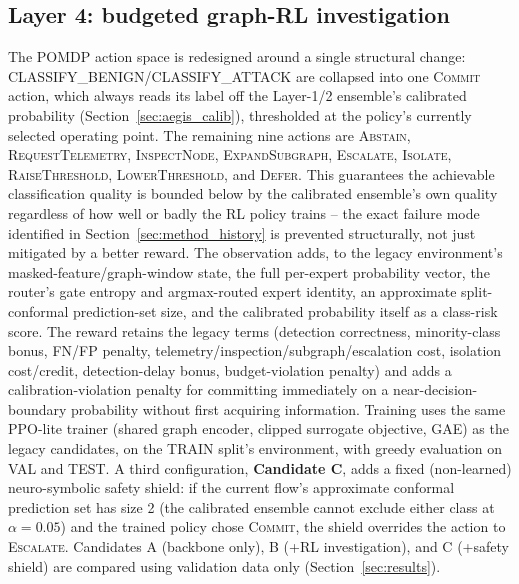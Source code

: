 \documentclass[journal]{IEEEtran}
\begin{document}
\subsection{Layer 4: budgeted graph-RL investigation}
\label{sec:aegis_rl}
The POMDP action space is redesigned around a single structural change:
CLASSIFY\_BENIGN/CLASSIFY\_ATTACK are collapsed into one \textsc{Commit}
action, which always reads its label off the Layer-1/2 ensemble's calibrated
probability (Section~\ref{sec:aegis_calib}), thresholded at the policy's
currently selected operating point. The remaining nine actions are
\textsc{Abstain}, \textsc{RequestTelemetry}, \textsc{InspectNode},
\textsc{ExpandSubgraph}, \textsc{Escalate}, \textsc{Isolate},
\textsc{RaiseThreshold}, \textsc{LowerThreshold}, and \textsc{Defer}. This
guarantees the achievable classification quality is bounded below by the
calibrated ensemble's own quality regardless of how well or badly the RL
policy trains -- the exact failure mode identified in
Section~\ref{sec:method_history} is prevented structurally, not just
mitigated by a better reward. The observation adds, to the legacy
environment's masked-feature/graph-window state, the full per-expert
probability vector, the router's gate entropy and argmax-routed expert
identity, an approximate split-conformal prediction-set size, and the
calibrated probability itself as a class-risk score. The reward retains the
legacy terms (detection correctness, minority-class bonus, FN/FP penalty,
telemetry/inspection/subgraph/escalation cost, isolation cost/credit,
detection-delay bonus, budget-violation penalty) and adds a
calibration-violation penalty for committing immediately on a near-decision-boundary
probability without first acquiring information. Training uses the same
PPO-lite trainer (shared graph encoder, clipped surrogate objective, GAE)
as the legacy candidates, on the TRAIN split's environment, with greedy
evaluation on VAL and TEST. A third configuration, \textbf{Candidate C},
adds a fixed (non-learned) neuro-symbolic safety shield: if the current
flow's approximate conformal prediction set has size 2 (the calibrated
ensemble cannot exclude either class at $\alpha{=}0.05$) and the trained
policy chose \textsc{Commit}, the shield overrides the action to
\textsc{Escalate}. Candidates A (backbone only), B (+RL investigation), and C
(+safety shield) are compared using validation data only
(Section~\ref{sec:results}).
\end{document}
